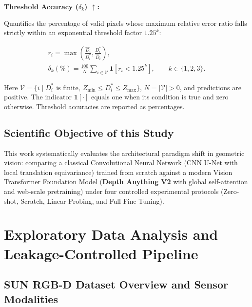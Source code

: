 \documentclass[twoside,final]{hcmut-report}
\begin{document}
  \noindent \textbf{Threshold Accuracy ($\delta_k$) $\uparrow$:}

  Quantifies the percentage of valid pixels whose maximum relative error ratio falls strictly within an exponential threshold factor $1.25^k$:

  \begin{equation}
\begin{gathered}
r_i=\max\!\left(\frac{\hat{D}_i}{D_i^*},
                 \frac{D_i^*}{\hat{D}_i}\right),\\
\delta_k(\%)=\frac{100}{N}\sum_{i\in\mathcal{V}}
\mathbf{1}\!\left[r_i<1.25^k\right],
\qquad k\in\{1,2,3\}.
\end{gathered}
\end{equation}

  Here $\mathcal{V}=\{i\mid D_i^*\text{ is finite},\ Z_{\min}\leq D_i^*\leq Z_{\max}\}$,
$N=|\mathcal{V}|>0$, and predictions are positive. The indicator $\mathbf{1}[\cdot]$ equals one when its condition is true and zero otherwise. Threshold accuracies are reported as percentages.

\subsection{Scientific Objective of this Study}

This work systematically evaluates the architectural paradigm shift in geometric vision: comparing a classical Convolutional Neural Network (CNN U-Net with local translation equivariance) trained from scratch against a modern Vision Transformer Foundation Model (\textbf{Depth Anything V2} with global self-attention and web-scale pretraining) under four controlled experimental protocols (Zero-shot, Scratch, Linear Probing, and Full Fine-Tuning).




\FloatBarrier

\section{Exploratory Data Analysis and Leakage-Controlled Pipeline}

\label{sec:eda_pipeline}

\subsection{SUN RGB-D Dataset Overview and Sensor Modalities}
\end{document}
